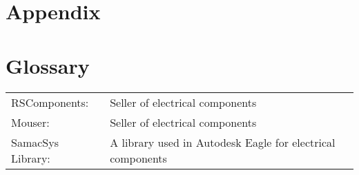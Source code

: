 \documentclass[12pt]{article}
\begin{document}

\newpage










\newpage
\section*{Appendix}

\vspace{3cm}

\newpage
\section*{Glossary}

\begin{table}[H]
\begin{tabular}{ l l }
  RSComponents: & Seller of electrical components \\
  Mouser:       & Seller of electrical components \\
  SamacSys Library:     & A library used in Autodesk Eagle for electrical components \\
\end{tabular}
\end{table}
\vspace{3cm}




\end{document}
